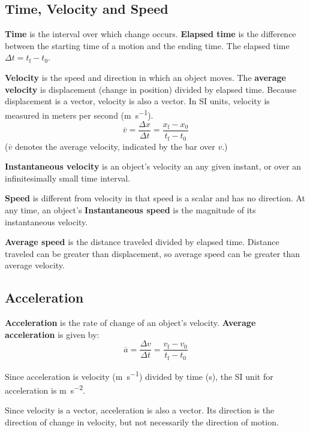 \documentclass{article}
\newcommand{\definition}[1]{\begin{tcolorbox}[colback=red!5!white,colframe=red!75!black,parbox=false] #1 \end{tcolorbox}}
\begin{document}
\subsection{Time, Velocity and Speed}

\definition{\textbf{Time} is the interval over which change occurs. \textbf{Elapsed time} is the difference between the starting time of a motion and the ending time. The elapsed time $\Delta t=t_\text{f}-t_0$.}

\definition{\textbf{Velocity} is the speed and direction in which an object moves. The \textbf{average velocity} is displacement (change in position) divided by elapsed time. Because displacement is a vector, velocity is also a vector. In SI units, velocity is measured in meters per second (\si{\meter\per\second}).
\begin{equation*}
    \overline v=\frac{\Delta x}{\Delta t}=\frac{x_\text{f}-x_0}{t_\text{f}-t_0}
\end{equation*}
($\overline v$ denotes the average velocity, indicated by the bar over $v$.)}

\definition{\textbf{Instantaneous velocity} is an object's velocity an any given instant, or over an infinitesimally small time interval.}

\definition{\textbf{Speed} is different from velocity in that speed is a scalar and has no direction. At any time, an object's \textbf{Instantaneous speed} is the magnitude of its instantaneous velocity.}

\definition{\textbf{Average speed} is the distance traveled divided by elapsed time. Distance traveled can be greater than displacement, so average speed can be greater than average velocity.}

\subsection{Acceleration}

\definition{\textbf{Acceleration} is the rate of change of an object's velocity. \textbf{Average acceleration} is given by:
\begin{equation*}
    \overline a=\frac{\Delta v}{\Delta t}=\frac{v_\text{f}-v_0}{t_\text{f}-t_0}
\end{equation*}}
Since acceleration is velocity (\si{\meter\per\second}) divided by time (\si{\second}), the SI unit for acceleration is \si{\meter\per\second^2}.

Since velocity is a vector, acceleration is also a vector. Its direction is the direction of change in velocity, but not necessarily the direction of motion.
\end{document}
